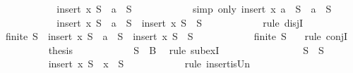 \begin{isabellebody}
\ \ \ \ \ \ \ \ \isamarkupfalse%
\ \isamarkupfalse%
\ {\isachardoublequoteopen}insert\ x\ S\ {\isacharequal}\ {\isacharbraceleft}a{\isacharbraceright}\ {\isasymunion}\ S{\isacharprime}{\isachardoublequoteclose}\isanewline
\ \ \ \ \ \ \ \ \ \ \isamarkupfalse%
\ {\isacharparenleft}simp\ only{\isacharcolon}\ {\isacartoucheopen}insert\ x\ {\isacharparenleft}{\isacharbraceleft}a{\isacharbraceright}\ {\isasymunion}\ S{\isacharprime}{\isacharparenright}\ {\isacharequal}\ {\isacharbraceleft}a{\isacharbraceright}\ {\isasymunion}\ S{\isacharprime}{\isacartoucheclose}{\isacharparenright}\isanewline
\ \ \ \ \ \ \ \ \isamarkupfalse%
\ \isamarkupfalse%
\ {}{\isacharcolon}{\isachardoublequoteopen}insert\ x\ S\ {\isacharequal}\ {\isacharbraceleft}a{\isacharbraceright}\ {\isasymunion}\ S{\isacharprime}\ {\isasymor}\ insert\ x\ S\ {\isacharequal}\ S{\isacharprime}{\isachardoublequoteclose}\isanewline
\ \ \ \ \ \ \ \ \ \ \isamarkupfalse%
\ {\isacharparenleft}rule\ disjI{}{\isacharparenright}\isanewline
\ \ \ \ \ \ \ \ \isamarkupfalse%
\ {\isachardoublequoteopen}finite\ S{\isacharprime}\ {\isasymand}\ {\isacharparenleft}insert\ x\ S\ {\isacharequal}\ {\isacharbraceleft}a{\isacharbraceright}\ {\isasymunion}\ S{\isacharprime}\ {\isasymor}\ insert\ x\ S\ {\isacharequal}\ S{\isacharprime}{\isacharparenright}{\isachardoublequoteclose}\isanewline
\ \ \ \ \ \ \ \ \ \ \isamarkupfalse%
\ {\isacartoucheopen}finite\ S{\isacharprime}{\isacartoucheclose}\ {}\ \isamarkupfalse%
\ {\isacharparenleft}rule\ conjI{\isacharparenright}\isanewline
\ \ \ \ \ \ \ \ \isamarkupfalse%
\ {\isacharquery}thesis\isanewline
\ \ \ \ \ \ \ \ \ \ \isamarkupfalse%
\ {\isacartoucheopen}S{\isacharprime}\ {\isasymsubseteq}\ B{\isacartoucheclose}\ \isamarkupfalse%
\ {\isacharparenleft}rule\ subexI{\isacharparenright}\isanewline
\ \ \ \ \ \ \isamarkupfalse%
\isanewline
\ \ \ \ \ \ \ \ \isamarkupfalse%
\ {\isachardoublequoteopen}S\ {\isacharequal}\ S{\isacharprime}{\isachardoublequoteclose}\isanewline
\ \ \ \ \ \ \ \ \isamarkupfalse%
\ {\isachardoublequoteopen}insert\ x\ S\ {\isacharequal}\ {\isacharbraceleft}x{\isacharbraceright}\ {\isasymunion}\ S{\isachardoublequoteclose}\isanewline
\ \ \ \ \ \ \ \ \ \ \isamarkupfalse%
\ {\isacharparenleft}rule\ insert{\isacharunderscore}is{\isacharunderscore}Un{\isacharparenright}\isanewline

\end{isabellebody}
